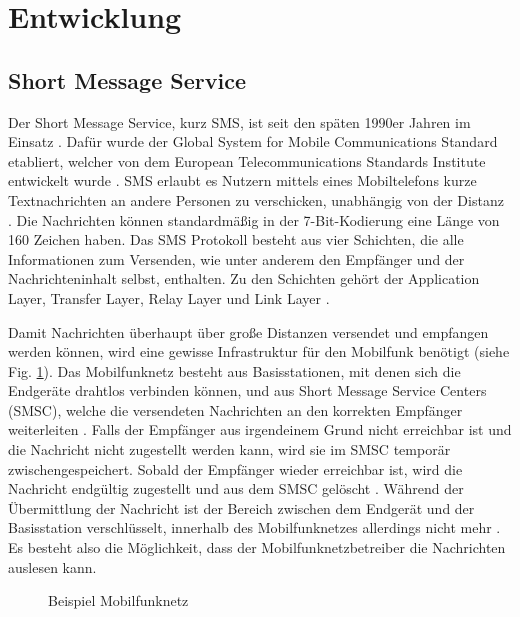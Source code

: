 \documentclass[conference]{IEEEtran}
\begin{document}
\section{Entwicklung}

\subsection{Short Message Service}

Der Short Message Service, kurz SMS, ist seit den späten 1990er Jahren im Einsatz \cite{sendoutsms}.
Dafür wurde der Global System for Mobile Communications Standard etabliert, welcher von dem European Telecommunications Standards Institute entwickelt wurde \cite{smshow}.
SMS erlaubt es Nutzern mittels eines Mobiltelefons kurze Textnachrichten an andere Personen zu verschicken, unabhängig von der Distanz \cite{sendoutsms}.
Die Nachrichten können standardmäßig in der 7-Bit-Kodierung eine Länge von 160 Zeichen haben.
Das SMS Protokoll besteht aus vier Schichten, die alle Informationen zum Versenden, wie unter anderem den Empfänger und der Nachrichteninhalt selbst, enthalten.
Zu den Schichten gehört der Application Layer, Transfer Layer, Relay Layer und Link Layer \cite{smshow}.

Damit Nachrichten überhaupt über große Distanzen versendet und empfangen werden können, wird eine gewisse Infrastruktur für den Mobilfunk benötigt (siehe Fig. \ref{mobilfunknetz}).
Das Mobilfunknetz besteht aus Basisstationen, mit denen sich die Endgeräte drahtlos verbinden können, und aus Short Message Service Centers (SMSC), welche die versendeten Nachrichten an den korrekten Empfänger weiterleiten \cite{sendoutsms}.
Falls der Empfänger aus irgendeinem Grund nicht erreichbar ist und die Nachricht nicht zugestellt werden kann, wird sie im SMSC temporär zwischengespeichert. Sobald der Empfänger wieder erreichbar ist, wird die Nachricht endgültig zugestellt und aus dem SMSC gelöscht \cite{smshow}.
Während der Übermittlung der Nachricht ist der Bereich zwischen dem Endgerät und der Basisstation verschlüsselt, innerhalb des Mobilfunknetzes allerdings nicht mehr \cite{sendoutsms}. Es besteht also die Möglichkeit, dass der Mobilfunknetzbetreiber die Nachrichten auslesen kann.

\begin{figure}
    \centerline{}
    \caption{Beispiel Mobilfunknetz \cite{sendoutsms}}
    \label{mobilfunknetz}
\end{figure}
\end{document}

